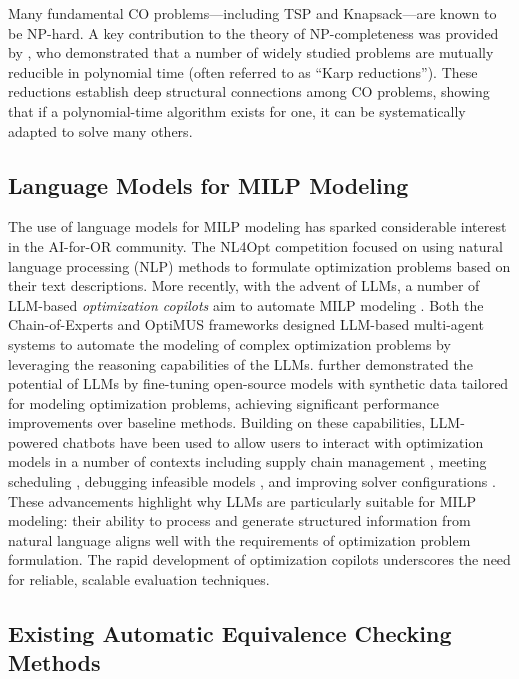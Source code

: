 Many fundamental CO problems---including TSP and Knapsack---are known to be NP-hard. A key contribution to the theory of NP-completeness was provided by \citet{Karp10}, who demonstrated that a number of widely studied problems are mutually reducible in polynomial time (often referred to as ``Karp reductions''). These reductions establish deep structural connections among CO problems, showing that if a polynomial-time algorithm exists for one, it can be systematically adapted to solve many others. 


\subsection{Language Models for MILP Modeling}

The use of language models for MILP modeling has sparked considerable interest in the AI-for-OR community. The NL4Opt competition \cite{ramamonjison23} focused on using natural language processing (NLP) methods to formulate optimization problems based on their text descriptions. More recently, with the advent of LLMs, a number of LLM-based \emph{optimization copilots} aim to automate MILP modeling \cite{ mostajabdaveh24, ahmed24,li23,yu24,huang2024large,kadiouglu24, yang2024optibench}. %
Both the Chain-of-Experts \cite{xiao24} and OptiMUS \cite{Ahmaditeshizi24} frameworks designed LLM-based multi-agent systems to automate the modeling of complex optimization problems by leveraging the reasoning capabilities of the LLMs.  
\citet{tang24} further demonstrated the potential of LLMs by fine-tuning open-source models with synthetic data tailored for modeling optimization problems, achieving significant performance improvements over baseline methods. Building on these capabilities, LLM-powered chatbots have been used to allow users to interact with optimization models in a number of contexts including supply chain management \cite{li2023large}, meeting scheduling \cite{lawless2024want}, debugging infeasible models \cite{chen2023diagnosing}, and improving solver configurations \cite{lawless2024llms}.
These advancements highlight why LLMs are particularly suitable for MILP modeling: their ability to process and generate structured information from natural language aligns well with the requirements of optimization problem formulation.  
The rapid development of optimization copilots underscores
the need for reliable, scalable evaluation techniques.



\subsection{Existing Automatic Equivalence Checking Methods}%

